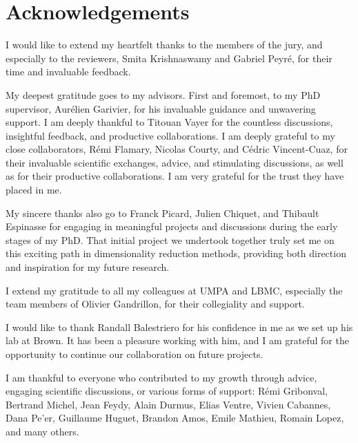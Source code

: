 \chapter*{Acknowledgements}\label{cha:ack}

I would like to extend my heartfelt thanks to the members of the jury, and especially to the reviewers, Smita Krishnaswamy and Gabriel Peyré, for their time and invaluable feedback.

My deepest gratitude goes to my advisors. First and foremost, to my PhD supervisor, Aurélien Garivier, for his invaluable guidance and unwavering support. I am deeply thankful to Titouan Vayer for the countless discussions, insightful feedback, and productive collaborations. I am deeply grateful to my close collaborators, Rémi Flamary, Nicolas Courty, and Cédric Vincent-Cuaz, for their invaluable scientific exchanges, advice, and stimulating discussions, as well as for their productive collaborations. I am very grateful for the trust they have placed in me.

My sincere thanks also go to Franck Picard, Julien Chiquet, and Thibault Espinasse for engaging in meaningful projects and discussions during the early stages of my PhD. That initial project we undertook together truly set me on this exciting path in dimensionality reduction methods, providing both direction and inspiration for my future research.

I extend my gratitude to all my colleagues at UMPA and LBMC, especially the team members of Olivier Gandrillon, for their collegiality and support.

I would like to thank Randall Balestriero for his confidence in me as we set up his lab at Brown. It has been a pleasure working with him, and I am grateful for the opportunity to continue our collaboration on future projects.

I am thankful to everyone who contributed to my growth through advice, engaging scientific discussions, or various forms of support: Rémi Gribonval, Bertrand Michel, Jean Feydy, Alain Durmus, Elias Ventre, Vivien Cabannes, Dana Pe'er, Guillaume Huguet, Brandon Amos, Emile Mathieu, Romain Lopez, and many others.

\newpage